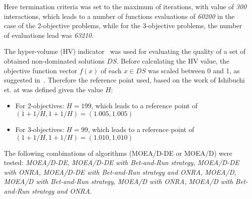 Here termination criteria was set to the maximum of iterations, with value of \textit{300} interactions, which leads to a number of functions evaluations of \textit{60200} in the case of the 2-objective problems, while for the 3-objective problems, the number of evaluations lead was \textit{63210}.

The hyper-volume (HV) indicator~\cite{zitzler1998multiobjective} was used for evaluating the quality of a set of obtained non-dominated solutions $DS$. Before calculating the HV value, the objective function vector $f(x)$ of each $x \in DS$ was scaled between 0 and 1, as suggested in~\cite{ishibuchi2018specify}. Therefore the reference point used, based on the work of Ishibuchi et. at was defined given the value $H$:
\begin{itemize}
	\item For 2-objectives: $H = 199$, which leads to a reference point of $(1+1/H, 1+1/H) = (1.005, 1.005)$
	\item For 3-objectives: $H = 99$, which leads to a reference point of $(1+1/H, 1+1/H) = (1.010, 1.010)$
\end{itemize}



The following combinations of algorithms (MOEA/D-DE or MOEA/D) were tested: \textit{MOEA/D-DE}, \textit{MOEA/D-DE with Bet-and-Run strategy}, \textit{MOEA/D-DE with ONRA}, \textit{MOEA/D-DE with Bet-and-Run strategy and ONRA}, \textit{MOEA/D}, \textit{MOEA/D with Bet-and-Run strategy}, \textit{MOEA/D with ONRA},  \textit{MOEA/D with Bet-and-Run strategy and ONRA}.

